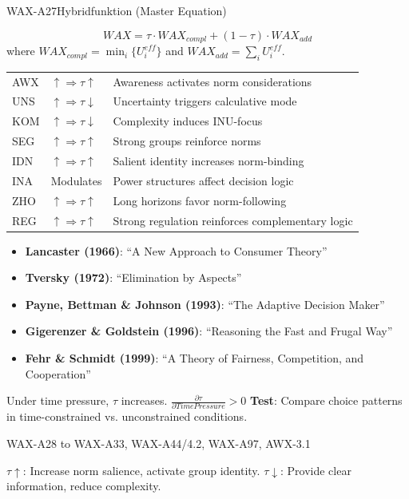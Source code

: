 \begin{axiomspec}{WAX-A27}{Hybridfunktion (Master Equation)}

\begin{equation}
WAX = \tau \cdot WAX_{compl} + (1-\tau) \cdot WAX_{add}
\end{equation}
where $WAX_{compl} = \min_i\{U_i^{eff}\}$ and $WAX_{add} = \sum_i U_i^{eff}$.

\begin{tabular}{lll}
AWX & $\uparrow \Rightarrow \tau \uparrow$ & Awareness activates norm considerations \\
UNS & $\uparrow \Rightarrow \tau \downarrow$ & Uncertainty triggers calculative mode \\
KOM & $\uparrow \Rightarrow \tau \downarrow$ & Complexity induces INU-focus \\
SEG & $\uparrow \Rightarrow \tau \uparrow$ & Strong groups reinforce norms \\
IDN & $\uparrow \Rightarrow \tau \uparrow$ & Salient identity increases norm-binding \\
INA & Modulates & Power structures affect decision logic \\
ZHO & $\uparrow \Rightarrow \tau \uparrow$ & Long horizons favor norm-following \\
REG & $\uparrow \Rightarrow \tau \uparrow$ & Strong regulation reinforces complementary logic \\
\end{tabular}

\begin{itemize}
\item \textbf{Lancaster (1966)}: ``A New Approach to Consumer Theory''
\item \textbf{Tversky (1972)}: ``Elimination by Aspects''
\item \textbf{Payne, Bettman \& Johnson (1993)}: ``The Adaptive Decision Maker''
\item \textbf{Gigerenzer \& Goldstein (1996)}: ``Reasoning the Fast and Frugal Way''
\item \textbf{Fehr \& Schmidt (1999)}: ``A Theory of Fairness, Competition, and Cooperation''
\end{itemize}

Under time pressure, $\tau$ increases. $\frac{\partial \tau}{\partial TimePressure} > 0$
\textbf{Test}: Compare choice patterns in time-constrained vs. unconstrained conditions.

WAX-A28 to WAX-A33, WAX-A44/4.2, WAX-A97, AWX-3.1

$\tau \uparrow$: Increase norm salience, activate group identity.
$\tau \downarrow$: Provide clear information, reduce complexity.

\end{axiomspec}

